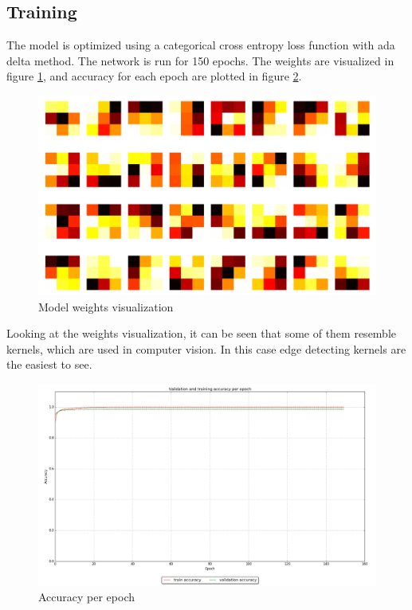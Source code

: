 \documentclass[paper=a4, fontsize=11pt]{scrartcl} %
\begin{document}
    \subsection*{Training}
    The model is optimized using a categorical cross entropy loss function with ada delta method. The network is run for 150 epochs. The weights are visualized in figure \ref{fig:weights}, and accuracy for each epoch are plotted in figure \ref{fig:train}.
    \begin{figure}[H]
        \begin{center}
            \includegraphics[width=1.0\linewidth]{images/mnist_weights.png}
            \caption{Model weights visualization}
            \label{fig:weights}
        \end{center}
    \end{figure}
	Looking at the weights visualization, it can be seen that some of them resemble kernels, which are used in computer vision. In this case edge detecting kernels are the easiest to see.

    \begin{figure}[H]
        \begin{center}
            \includegraphics[width=1.0\linewidth]{images/mnist_training_log.png}
            \caption{Accuracy per epoch}
            \label{fig:train}
        \end{center}
    \end{figure}
	
\end{document}
